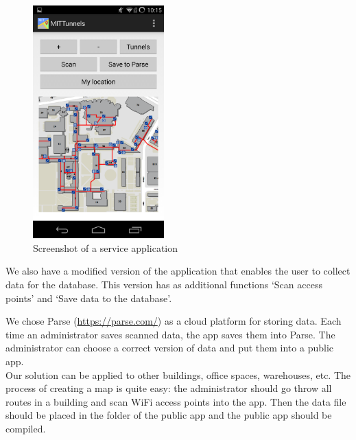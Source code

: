 \documentclass[11pt]{article}
\begin{document}
\begin{figure}[h]
\begin{center}
	\includegraphics[width=0.45\textwidth]{ScreenshotDeveloper.png}
\end{center}
\caption{Screenshot of a service application}
\label{fig:tunnels_all}
\end{figure}

We also have a modified version of the application that enables the user to collect data for the database. This version has as additional functions ‘Scan access points’ and ‘Save data to the database’.

We chose Parse (\url{https://parse.com/}) as a cloud platform for storing data. Each time an administrator saves scanned data, the app saves them into Parse. The administrator can choose a correct version of data and put them into a public app.\\

Our solution can be applied to other buildings, office spaces, warehouses, etc. The process of creating a map is quite easy: the administrator should go throw all routes in a building and scan WiFi access points into the app. Then the data file should be placed in the folder of the public app and the public app should be compiled.
\end{document}
